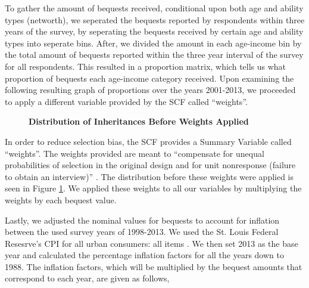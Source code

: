 \documentclass[letterpaper,12pt]{article}
\newcommand{\quotes}[1]{``#1''}
\theoremstyle{definition}
\begin{document}
\begin{spacing}{1.5}
 To gather the amount of bequests received, conditional upon both age and ability types (networth), we seperated the bequests reported by respondents within three years of the survey, by seperating the bequests received by certain age and ability types into seperate bins. After, we divided the amount in each age-income bin by the total amount of bequests reported within the three year interval of the survey for all respondents. This resulted in a proportion matrix, which tells us what proportion of bequests each age-income category received. Upon examining the following resulting graph of proportions over the years 2001-2013, we proceeded to apply a different variable provided by the SCF called \quotes{weights}.

\begin{figure}[htbp]\centering \captionsetup{width=5.5in}
    \caption{\label{Weightfig}\textbf{Distribution of Inheritances Before Weights Applied}}
  \end{figure}
\newpage

 In order to reduce selection bias, the SCF provides a Summary Variable called \quotes{weights}. The weights provided are meant to \quotes{compensate for unequal probabilities of selection in the original design and for unit nonresponse (failure to obtain an interview)} \citet{FEDweight}. The distribution before these weights were applied is seen in Figure \ref{Weightfig}. We applied these weights to all our variables by multiplying the weights by each bequest value.


Lastly, we adjusted the nominal values for bequests to account for inflation between the used survey years of 1998-2013. We used the St. Louis Federal Resesrve's CPI for all urban consumers: all items \citet{StFed} . We then set 2013 as the base year and calculated the percentage inflation factors for all the years down to 1988. The inflation factors, which will be multiplied by the bequest amounts that correspond to each year, are given as follows,


\end{spacing}
\end{document}
